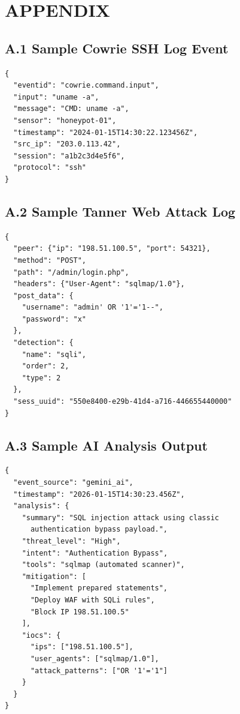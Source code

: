 \documentclass[12pt,a4paper]{report}
\begin{document}
\chapter*{APPENDIX}
\thispagestyle{mainpages}

\section*{A.1 Sample Cowrie SSH Log Event}

\begin{lstlisting}[caption=Cowrie JSON Log Sample]
{
  "eventid": "cowrie.command.input",
  "input": "uname -a",
  "message": "CMD: uname -a",
  "sensor": "honeypot-01",
  "timestamp": "2024-01-15T14:30:22.123456Z",
  "src_ip": "203.0.113.42",
  "session": "a1b2c3d4e5f6",
  "protocol": "ssh"
}
\end{lstlisting}

\section*{A.2 Sample Tanner Web Attack Log}

\begin{lstlisting}[caption=Tanner JSON Log Sample]
{
  "peer": {"ip": "198.51.100.5", "port": 54321},
  "method": "POST",
  "path": "/admin/login.php",
  "headers": {"User-Agent": "sqlmap/1.0"},
  "post_data": {
    "username": "admin' OR '1'='1--",
    "password": "x"
  },
  "detection": {
    "name": "sqli",
    "order": 2,
    "type": 2
  },
  "sess_uuid": "550e8400-e29b-41d4-a716-446655440000"
}
\end{lstlisting}

\section*{A.3 Sample AI Analysis Output}

\begin{lstlisting}[caption=AI Analysis JSON Output]
{
  "event_source": "gemini_ai",
  "timestamp": "2026-01-15T14:30:23.456Z",
  "analysis": {
    "summary": "SQL injection attack using classic 
      authentication bypass payload.",
    "threat_level": "High",
    "intent": "Authentication Bypass",
    "tools": "sqlmap (automated scanner)",
    "mitigation": [
      "Implement prepared statements",
      "Deploy WAF with SQLi rules",
      "Block IP 198.51.100.5"
    ],
    "iocs": {
      "ips": ["198.51.100.5"],
      "user_agents": ["sqlmap/1.0"],
      "attack_patterns": ["OR '1'='1"]
    }
  }
}
\end{lstlisting}
\end{document}
